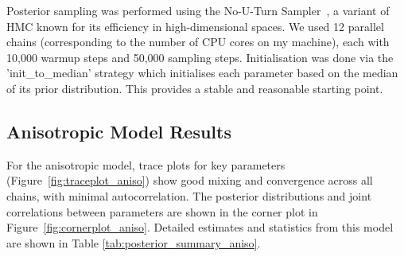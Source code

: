 \documentclass[a4paper,12pt]{article}
\begin{document}
Posterior sampling was performed using the No-U-Turn Sampler~\cite{hoffman2011nouturnsampleradaptivelysetting}, a variant of HMC known for its efficiency in high-dimensional spaces. We used 12 parallel chains (corresponding to the number of CPU cores on my machine), each with 10,000 warmup steps and 50,000 sampling steps. Initialisation was done via the 'init\_to\_median' strategy which initialises each parameter based on the median of its prior distribution. This provides a stable and reasonable starting point.

\subsection*{Anisotropic Model Results}

For the anisotropic model, trace plots for key parameters (Figure~\ref{fig:traceplot_aniso}) show good mixing and convergence across all chains, with minimal autocorrelation. The posterior distributions and joint correlations between parameters are shown in the corner plot in Figure~\ref{fig:cornerplot_aniso}. Detailed estimates and statistics from this model are shown in Table \ref{tab:posterior_summary_aniso}.
\end{document}
